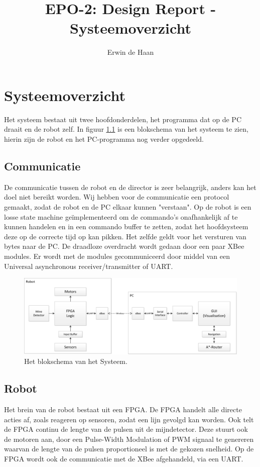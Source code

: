 \documentclass{report}
\title{EPO-2: Design Report - Systeemoverzicht}
\author{Erwin de Haan}
\begin{document}
\chapter{Systeemoverzicht}
\label{ch:systeem}
Het systeem bestaat uit twee hoofdonderdelen, het programma dat op de PC draait en de robot zelf.
In figuur \ref{fig:topLevelSystem} is een blokschema van het systeem te zien, hierin zijn de robot en het PC-programma nog verder opgedeeld. 
\section{Communicatie}
De communicatie tussen de robot en de director is zeer belangrijk, anders kan het doel niet bereikt worden.
Wij hebben voor de communicatie een protocol gemaakt, zodat de robot en de PC elkaar kunnen "verstaan".
Op de robot is een losse state machine geïmplementeerd om de commando's onafhankelijk af te kunnen handelen en in een commando buffer te zetten, zodat het hoofdsysteem deze op de correcte tijd op kan pikken.
Het zelfde geldt voor het versturen van bytes naar de PC.
De draadloze overdracht wordt gedaan door een paar XBee modules.
Er wordt met de modules gecommuniceerd door middel van een Universal asynchronous receiver/transmitter of UART.
\begin{figure}
\centering
\caption{Het blokschema van het Systeem.}
\label{fig:topLevelSystem}
\includegraphics[width=\textwidth]{top-level-system}
\end{figure}
\section{Robot}
Het brein van de robot bestaat uit een FPGA.
De FPGA handelt alle directe acties af, zoals reageren op sensoren, zodat een lijn gevolgd kan worden.
Ook telt de FPGA continu de lengte van de pulsen uit de mijndetector.
Deze stuurt ook de motoren aan, door een Pulse-Width Modulation of PWM signaal te genereren waarvan de lengte van de pulsen proportioneel is met de gekozen snelheid.
Op de FPGA wordt ook de communicatie met de XBee afgehandeld, via een UART.
\end{document}
